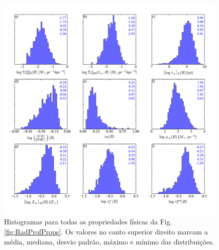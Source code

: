 \begin{figure}
	\centering
	\includegraphics[width=0.99\textwidth]{figuras/histo_props_R.pdf}
	\caption[Histogramas dos perfis radiais das propriedades físicas.]
	{Histogramas para todas as propriedades físicas da Fig. \ref{fig:RadProfProps}. Os valores no canto
superior direito marcam a média, mediana, desvio padrão, máximo e mínimo das distribuições.}
	\label{fig:HistoRadProfProps}
\end{figure}

